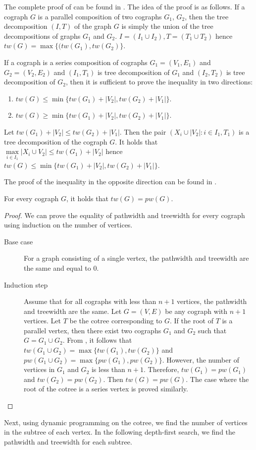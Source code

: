 The complete proof of  can be found in \cite{Sumner1974DaceyG}.
 The idea of the proof is as follows. If a cograph $G$ is a parallel composition of two cographs $G_1$, $G_2$, then the tree decomposition $(I,T)$ of the graph $G$ is simply the union of the tree decompositions of graphs $G_1$ and $G_2$. $I=(I_1 \cup I_2), T=(T_1 \cup T_2)$ hence $tw(G)= \max\{(tw(G_1), tw(G_2)\}$.

 If a cograph is a series composition of cographs $G_1=(V_1,E_1)$ and $G_2=(V_2,E_2)$ and $(I_1,T_1)$ is tree decomposition of $G_1$ and $(I_2,T_2)$ is tree decomposition of $G_2$, then it is sufficient to prove the inequality in two directions:
 \begin{enumerate}
     \item $tw(G)\le \min\{tw(G_1) + |V_2|, tw(G_2) + |V_1|\}$.
     \item $tw(G)\ge \min\{tw(G_1) + |V_2|, tw(G_2) + |V_1|\}$.
 \end{enumerate}
 Let $tw(G_1) + |V_2| \le tw(G_2) + |V_1|$. Then the pair $(X_i \cup |V_2| \colon i \in I_1,T_1)$ is a tree decomposition of the cograph $G$. It holds that $\max\limits_{i \in I_1} |X_i \cup V_2| \le tw(G_1) + |V_2|$ hence $tw(G)\le \min\{tw(G_1) + |V_2|, tw(G_2) + |V_1|\}$.

The proof of the inequality in the opposite direction can be found in \cite{Sumner1974DaceyG}.
   
\begin{theorem}
     For every cograph $G$, it holds that $tw(G) = pw(G)$.
\end{theorem}

\begin{proof}
    We can prove the equality of pathwidth and treewidth for every cograph using induction on the number of vertices.
    \begin{description}
        \item[Base case] For a graph consisting of a single vertex, the pathwidth and treewidth are the same and equal to 0.
        \item[Induction step] Assume that for all cographs with less than $n+1$ vertices, the pathwidth and treewidth are the same. Let $G=(V, E)$ be any cograph with $n+1$ vertices. Let $T$ be the cotree corresponding to $G$. If the root of $T$ is a parallel vertex, then there exist two cographs $G_1$ and $G_2$ such that $G=G_1 \cup G_2$. From , it follows that $tw(G_1 \cup G_2)= \max \{tw(G_1), tw(G_2)\}$ and $pw(G_1 \cup G_2)= \max \{pw(G_1), pw(G_2)\}$.
        However, the number of vertices in $G_1$ and $G_2$ is less than $n+1$. Therefore, $tw(G_1)=pw(G_1)$ and $tw(G_2)=pw(G_2)$. Then $tw(G)=pw(G)$. The case where the root of the cotree is a series vertex is proved similarly.
    \end{description}

\end{proof}
Next, using dynamic programming on the cotree, we find the number of vertices in the subtree of each vertex. In the following depth-first search, we find the pathwidth and treewidth for each subtree.

